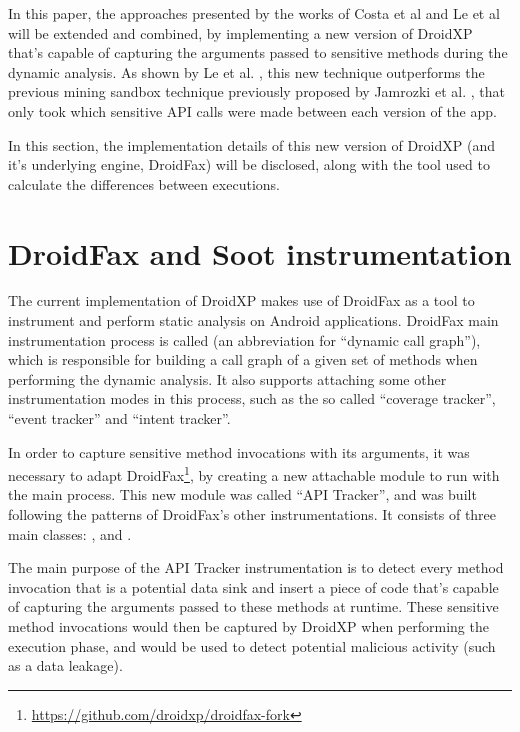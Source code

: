 In this paper, the approaches presented by the works of Costa et al \cite{costa_exploring_2022} and Le et al \cite{le_towards_2018} will be extended and combined, by implementing a new version of DroidXP that's capable of capturing the arguments passed to sensitive methods during the dynamic analysis. As shown by Le et al. \cite{le_towards_2018}, this new technique outperforms the previous mining sandbox technique previously proposed by Jamrozki et al. \cite{jamrozik_mining_2016}, that only took which sensitive API calls were made between each version of the app. 

In this section, the implementation details of this new version of DroidXP (and it's underlying engine, DroidFax) will be disclosed, along with the tool used to calculate the differences between executions.

\section{DroidFax and Soot instrumentation}

The current implementation of DroidXP makes use of DroidFax as a tool to instrument and perform static analysis on Android applications. DroidFax main instrumentation process is called  (an abbreviation for ``dynamic call graph''), which is responsible for building a call graph of a given set of methods when performing the dynamic analysis. It also supports attaching some other instrumentation modes in this process, such as the so called ``coverage tracker'', ``event tracker'' and ``intent tracker''.

In order to capture sensitive method invocations with its arguments, it was necessary to adapt DroidFax\footnote{\url{https://github.com/droidxp/droidfax-fork}}, by creating a new attachable module to run with the main process. This new module was called ``API Tracker'', and was built following the patterns of DroidFax's other instrumentations. It consists of three main classes: ,  and .

The main purpose of the API Tracker instrumentation is to detect every method invocation that is a potential data sink and insert a piece of code that's capable of capturing the arguments passed to these methods at runtime. These sensitive method invocations would then be captured by DroidXP when performing the execution phase, and would be used to detect potential malicious activity (such as a data leakage).

